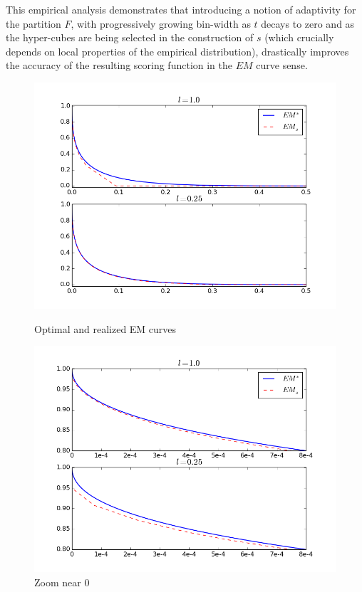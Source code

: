 This empirical analysis demonstrates that introducing a notion of adaptivity for the partition $F$, with progressively growing bin-width as $t$ decays to zero and as the hyper-cubes are being selected in the construction of $s$ (which crucially depends on local properties of the empirical distribution), drastically improves the accuracy of the resulting scoring function in the $EM$ curve sense. 
\noindent
\begin{figure}[!ht]
\begin{minipage}[c]{.5\linewidth}
\begin{center}
\includegraphics[width=\linewidth]{fig_source/EM-EMS.png}
\caption{Optimal and realized EM curves} %
\label{aistat:EMMS}
\end{center}
\end{minipage}
\hfill
\begin{minipage}[c]{.5\linewidth}
\begin{center}
\includegraphics[width=\linewidth]{fig_source/EM-EMSzoom.png}
\caption{Zoom near 0 ~~~~~~~~~~~~~~~~~~~~~~~~~~~~~~~~~~~~~~~~~~~~~~~~~} %
\label{aistat:EMMSzoom}
\end{center}
\end{minipage}
\end{figure}


